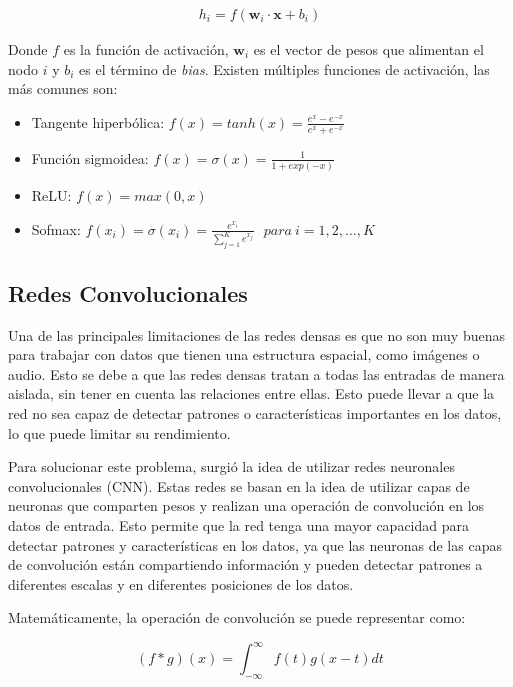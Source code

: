 \begin{align}
    h_i = f(\mathbf{w}_i \cdot \mathbf{x} + b_i)
\end{align}

Donde $f$ es la función de activación, $\mathbf{w}_i$ es el vector de pesos que alimentan el nodo $i$ y $b_i$ es el
término de {\it bias}. Existen múltiples funciones de activación, las más comunes son:

\begin{itemize}
    \item Tangente hiperbólica: $f(x) = tanh(x) = \frac{e^x - e^{-x}}{e^x + e^{-x}}$
    \item Función sigmoidea: $f(x) = \sigma(x) = \frac{1}{1+exp(-x)}$
    \item ReLU: $f(x) = max(0, x)$
    \item Sofmax: $f(x_i) = \sigma(x_i) = \frac{e^{x_{i}}}{\sum_{j=1}^K e^{x_{j}}} \ \ \ para\ i=1,2,\dots,K$
\end{itemize}

\subsection{Redes Convolucionales}
Una de las principales limitaciones de las redes densas es que no son muy buenas para trabajar con datos que tienen una
estructura espacial, como imágenes o audio. Esto se debe a que las redes densas tratan a todas las entradas de manera
aislada, sin tener en cuenta las relaciones entre ellas. Esto puede llevar a que la red no sea capaz de detectar
patrones o características importantes en los datos, lo que puede limitar su rendimiento.

Para solucionar este problema, surgió la idea de utilizar redes neuronales convolucionales (CNN). Estas redes se basan
en la idea de utilizar capas de neuronas que comparten pesos y realizan una operación de convolución en los datos de
entrada. Esto permite que la red tenga una mayor capacidad para detectar patrones y características en los datos, ya
que las neuronas de las capas de convolución están compartiendo información y pueden detectar patrones a diferentes
escalas y en diferentes posiciones de los datos.

Matemáticamente, la operación de convolución se puede representar como:

\begin{equation}
    (f * g)(x) = \int_{-\infty}^{\infty} f(t)g(x-t) dt
    \label{eq:convolucion}
\end{equation}

